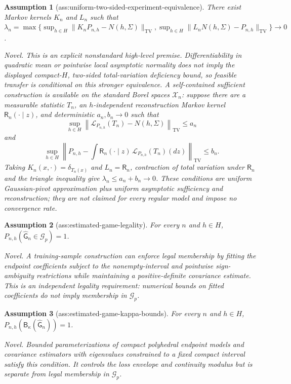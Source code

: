 \documentclass{article}
\newtheorem{assumption}{Assumption}
\begin{document}
\begin{assumption}[ass:uniform-two-sided-experiment-equivalence]\label{ass:uniform-two-sided-experiment-equivalence}
There exist Markov kernels \(K_n\) and \(L_n\) such that \(\lambda_n=\max\{\sup_{h\in H}\lVert K_nP_{n,h}-N(h,\Sigma)\rVert_{\mathrm{TV}},\sup_{h\in H}\lVert L_nN(h,\Sigma)-P_{n,h}\rVert_{\mathrm{TV}}\}\to0\).
\par\smallskip\noindent\emph{Novel.} This is an explicit nonstandard high-level premise. Differentiability in quadratic mean or pointwise local asymptotic normality does not imply the displayed compact-\(H\), two-sided total-variation deficiency bound, so feasible transfer is conditional on this stronger equivalence. A self-contained sufficient construction is available on the standard Borel spaces \(\mathcal X_n\): suppose there are a measurable statistic \(T_n\), an \(h\)-independent reconstruction Markov kernel \(\mathsf R_n(\cdot\mid z)\), and deterministic \(a_n,b_n\to0\) such that \[\sup_{h\in H}\left\lVert\mathcal L_{P_{n,h}}(T_n)-N(h,\Sigma)\right\rVert_{\mathrm{TV}}\le a_n\] and \[\sup_{h\in H}\left\lVert P_{n,h}-\int \mathsf R_n(\cdot\mid z)\,\mathcal L_{P_{n,h}}(T_n)(dz)\right\rVert_{\mathrm{TV}}\le b_n.\] Taking \(K_n(x,\cdot)=\delta_{T_n(x)}\) and \(L_n=\mathsf R_n\), contraction of total variation under \(\mathsf R_n\) and the triangle inequality give \(\lambda_n\le a_n+b_n\to0\). These conditions are uniform Gaussian-pivot approximation plus uniform asymptotic sufficiency and reconstruction; they are not claimed for every regular model and impose no convergence rate.
\end{assumption}

\begin{assumption}[ass:estimated-game-legality]\label{ass:estimated-game-legality}
For every \(n\) and \(h\in H\), \(P_{n,h}(\widehat{\mathsf G}_n\in\mathcal G_p)=1\).
\par\smallskip\noindent\emph{Novel.} A training-sample construction can enforce legal membership by fitting the endpoint coefficients subject to the nonempty-interval and pointwise sign-ambiguity restrictions while maintaining a positive-definite covariance estimate. This is an independent legality requirement: numerical bounds on fitted coefficients do not imply membership in \(\mathcal G_p\).
\end{assumption}

\begin{assumption}[ass:estimated-game-kappa-bounds]\label{ass:estimated-game-kappa-bounds}
For every \(n\) and \(h\in H\), \(P_{n,h}(\mathsf B_{\kappa}(\widehat{\mathsf G}_n))=1\).
\par\smallskip\noindent\emph{Novel.} Bounded parameterizations of compact polyhedral endpoint models and covariance estimators with eigenvalues constrained to a fixed compact interval satisfy this condition. It controls the loss envelope and continuity modulus but is separate from legal membership in \(\mathcal G_p\).
\end{assumption}
\end{document}
